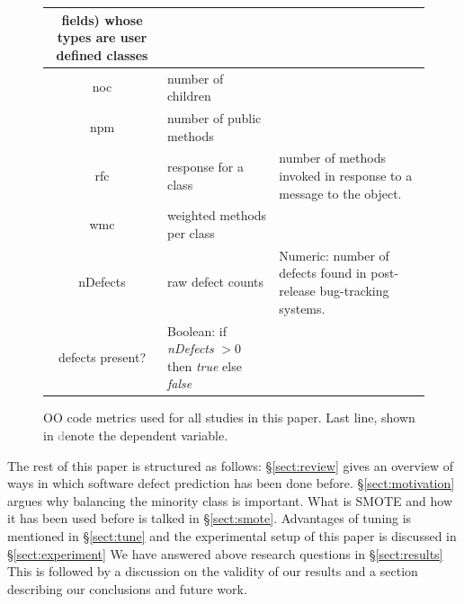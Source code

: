 \documentclass[sigconf,review, anonymous]{acmart}
\theoremstyle{break}
\theoremstyle{break}
\newcommand{\tion}[1]{{\S}\ref{sect:#1}}
\begin{document}
\begin{figure}[t!]
\begin{center}
{\begin{tabular}{c|l|p{4.0in}}
fields) whose types are user defined classes\\
\hline
noc & number of children &\\
\hline
npm & number of public methods & \\
\hline
rfc & response for a class &number of methods invoked in response to
a message to the object.\\
\hline
wmc & weighted methods per class &\\
\hline
\rowcolor{lightgray}
nDefects & raw defect counts & Numeric: number of defects found in post-release bug-tracking systems.\\
\rowcolor{lightgray}
defects present? & Boolean: if {\em nDefects} $>0$ then {\em true} else {\em false}
\end{tabular}
}
\end{center}
\caption{OO code metrics used for all studies in this paper.
Last line, shown in \textcolor{gray} denote the dependent variable.}
\label{fig:ck}
\end{figure}



The rest of this paper is structured as follows:
\tion{review} gives an overview of ways in which software defect prediction has been done before. \tion{motivation} argues why balancing the minority class is important.
What is SMOTE and how it has been used before is talked in \tion{smote}. Advantages
of tuning is mentioned in \tion{tune}
and the experimental setup of this paper is discussed in \tion{experiment}
We have answered above research questions in
\tion{results} This is followed by a discussion on the validity of our results 
and a section describing our conclusions and future work.


 


\end{document}
